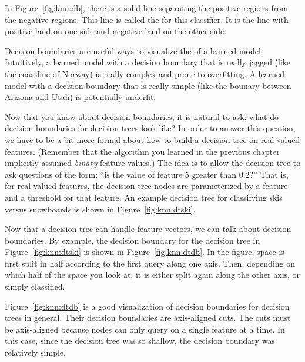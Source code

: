 In Figure~\ref{fig:knn:db}, there is a solid line separating the positive
regions from the negative regions.  This line is called the
 for this classifier.  It is the line with
positive land on one side and negative land on the other side.


Decision boundaries are useful ways to visualize the
 of a learned model.  Intuitively, a learned model
with a decision boundary that is really jagged (like the coastline of
Norway) is really complex and prone to overfitting.  A learned model
with a decision boundary that is really simple (like the bounary
between Arizona and Utah) is potentially underfit. 

Now that you know about decision boundaries, it is natural to ask:
what do decision boundaries for decision trees look like?  In order to
answer this question, we have to be a bit more formal about how to
build a decision tree on real-valued features.  (Remember that the
algorithm you learned in the previous chapter implicitly assumed
\emph{binary} feature values.)  The idea is to allow the decision tree
to ask questions of the form: ``is the value of feature $5$ greater
than $0.2$?''  That is, for real-valued features, the decision tree
nodes are parameterized by a feature and a threshold for that
feature.  An example decision tree for classifying skis versus
snowboards is shown in Figure~\ref{fig:knn:dtski}.



Now that a decision tree can handle feature vectors, we can talk about
decision boundaries.  By example, the decision boundary for the
decision tree in Figure~\ref{fig:knn:dtski} is shown in
Figure~\ref{fig:knn:dtdb}.  In the figure, space is first split in half
according to the first query along one axis.  Then, depending on which
half of the space you look at, it is either split again along the
other axis, or simply classified.


Figure~\ref{fig:knn:dtdb} is a good visualization of decision boundaries
for decision trees in general.  Their decision boundaries are
axis-aligned cuts.  The cuts must be axis-aligned because nodes can
only query on a single feature at a time.  In this case, since the
decision tree was so shallow, the decision boundary was relatively
simple.  

